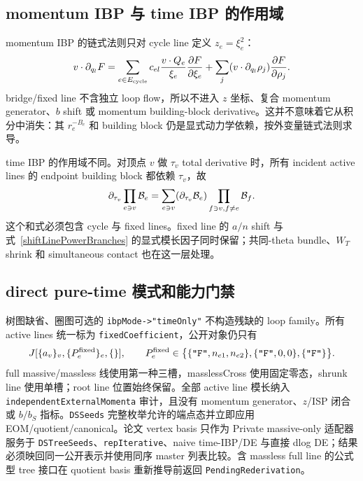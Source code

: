 ﻿\documentclass[a4paper,11pt]{article}
\begin{document}
\subsection{momentum IBP 与 time IBP 的作用域}

momentum IBP 的链式法则只对 cycle line 定义 $z_e=\xi_e^2$：
\begin{equation}
 v\cdot\partial_{q_l}F
 =\sum_{e\in E_{\rm cycle}}c_{el}{v\cdot Q_e\over\xi_e}
 {\partial F\over\partial\xi_e}
 +\sum_j(v\cdot\partial_{q_l}\rho_j){\partial F\over\partial\rho_j}.
 \label{cycleOnlyMomentumIBP}
\end{equation}
bridge/fixed line 不含独立 loop flow，所以不进入 $z$ 坐标、复合 momentum generator、$b$ shift 或 momentum building-block derivative。这并不意味着它从积分中消失：其 $r_e^{-B_e}$ 和 building block 仍是显式动力学依赖，按外变量链式法则求导。

time IBP 的作用域不同。对顶点 $v$ 做 $\tau_v$ total derivative 时，所有 incident active lines 的 endpoint building block 都依赖 $\tau_v$，故
\begin{equation}
 \partial_{\tau_v}\prod_{e\ni v}{\cal B}_e
 =\sum_{e\ni v}(\partial_{\tau_v}{\cal B}_e)
  \prod_{f\ni v,f\ne e}{\cal B}_f.
 \label{timeIBPAllIncidentLines}
\end{equation}
这个和式必须包含 cycle 与 fixed lines。fixed line 的 $a/n$ shift 与式~\eqref{shiftLinePowerBranches} 的显式模长因子同时保留；共同-theta bundle、$W_T$ shrink 和 simultaneous contact 也在这一层处理。

\subsection{direct pure-time 模式和能力门禁}

树图缺省、圈图可选的 \texttt{ibpMode->"timeOnly"} 不构造残缺的 loop family。所有 active lines 统一标为 \texttt{fixedCoefficient}，公开对象仍只有
\begin{equation}
 J[\{a_v\}_v,\{P_e^{\rm fixed}\}_e,\{\}],
 \qquad
 P_e^{\rm fixed}\in
 \bigl\{\{\texttt{"F"},n_{e1},n_{e2}\},
 \{\texttt{"F"},0,0\},\{\texttt{"F"}\}\bigr\}.
 \label{directPureTimeJ}
\end{equation}
full massive/massless 线使用第一种三槽，masslessCross 使用固定零态，shrunk line 使用单槽；root line 位置始终保留。全部 active line 模长纳入 \texttt{independentExternalMomenta} 审计，且没有 momentum generator、$z$/ISP 闭合或 $b/b_S$ 指标。\texttt{DSSeeds} 完整枚举允许的端点态并立即应用 EOM/quotient/canonical。论文 vertex basis 只作为 Private massive-only 适配器服务于 \texttt{DSTreeSeeds}、\texttt{repIterative}、naive time-IBP/DE 与直接 dlog DE；结果必须映回同一公开表示并使用同序 master 列表比较。含 massless full line 的公式型 tree 接口在 quotient basis 重新推导前返回 \texttt{PendingRederivation}。
\end{document}
